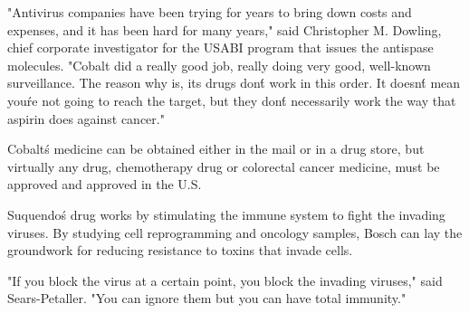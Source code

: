 \documentclass{article}
\begin{document}
"Antivirus companies have been trying for years to bring down costs and expenses, and it has been hard for many years," said Christopher M. Dowling, chief corporate investigator for the USABI program that issues the antispase molecules. "Cobalt did a really good job, really doing very good, well-known surveillance. The reason why is, its drugs don\'t work in this order. It doesn\'t mean you\'re not going to reach the target, but they don\'t necessarily work the way that aspirin does against cancer."

Cobalt\'s medicine can be obtained either in the mail or in a drug store, but virtually any drug, chemotherapy drug or colorectal cancer medicine, must be approved and approved in the U.S.

Suquendo\'s drug works by stimulating the immune system to fight the invading viruses. By studying cell reprogramming and oncology samples, Bosch can lay the groundwork for reducing resistance to toxins that invade cells.

"If you block the virus at a certain point, you block the invading viruses," said Sears-Petaller. "You can ignore them but you can have total immunity."
\end{document}
